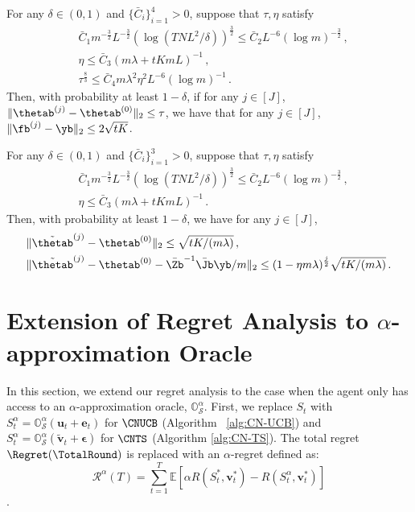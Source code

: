 \documentclass{article}
\theoremstyle{plain}
\begin{document}
\begin{lemma} \label{aux lemma:lemma C.3 in NeuralUCB}
For any $\delta \in (0,1)$ and $ \{ \bar{C}_i \}_{i=1}^4 > 0$, suppose that $\tau, \eta$ satisfy
%
    \begin{align*}
        & \bar{C}_1 m^{-\frac{3}{2}} L^{-\frac{3}{2}} \left( \log(T N L^2/\delta) \right)^{\frac{3}{2}} 
            \le 
            \bar{C}_2 L^{-6} (\log m)^{-\frac{3}{2}} \, ,
        \\
        & \eta \le \bar{C}_3 (m \lambda + tKmL)^{-1} \, ,
        \\
        & \tau^{\frac{8}{3}} \le \bar{C}_4 m \lambda^2 \eta^2 L^{-6} (\log m )^{-1} \, .
    \end{align*}
%
Then, with probability at least $1 - \delta$, if for any $j \in [J]$, $\| \thetab^{(j)} - \thetab^{(0)} \|_2 \le \tau$, we have that for any $j \in [J]$, $\| \fb^{(j)} - \yb \|_2 \le 2 \sqrt{tK}$.
\end{lemma}

\begin{lemma} \label{aux lemma:lemma C.4 in NeuralUCB}
For any $\delta \in (0,1)$ and $ \{ \bar{C}_i \}_{i=1}^3 > 0$, suppose that $\tau, \eta$ satisfy
%
    \begin{align*}
        & \bar{C}_1 m^{-\frac{3}{2}} L^{-\frac{3}{2}} \left( \log(T N L^2/\delta) \right)^{\frac{3}{2}} 
            \le 
            \bar{C}_2 L^{-6} (\log m)^{-\frac{3}{2}} \, ,
        \\
        & \eta \le \bar{C}_3 (m \lambda + tKmL)^{-1} \, .
    \end{align*}
%
Then, with probability at least $1 - \delta$, we have for any $j \in [J]$,
%
    \begin{align*}
        & \| \tilde{\thetab}^{(j)} - \thetab^{(0)} \|_2 \le \sqrt{tK/(m \lambda)} \, ,
        \\
        & \| \tilde{\thetab}^{(j)} - \thetab^{(0)} - \bar{\Zb}^{-1} \bar{\Jb} \yb / m \|_2 \le (1 - \eta m \lambda)^{\frac{j}{2}} \sqrt{tK/(m \lambda)} \, .
    \end{align*}
\end{lemma}

\section{Extension of Regret Analysis to $\alpha$-approximation Oracle} \label{appendix_Alpha Oracle}
In this section, we extend our regret analysis to the case when the agent only has access to an $\alpha$-approximation oracle, $\mathbb{O}_{\mathcal{S}}^{\alpha}$.
First, we replace $S_t$ with $S_t^{\alpha} = \mathbb{O}_{\mathcal{S}}^{\alpha} (\mathbf{u}_t + \mathbf{e}_t)$ for $\CNUCB$ (Algorithm~ \ref{alg:CN-UCB}) and $S_t^{\alpha} = \mathbb{O}_{\mathcal{S}}^{\alpha} (\mathbf{\tilde{v}}_t + \boldsymbol{\epsilon})$ for $\CNTS$ (Algorithm \ref{alg:CN-TS}).
The total regret $\Regret(\TotalRound)$ is replaced with an $\alpha$-regret defined as:
$$\mathcal{R}^{\alpha}(T) = \sum_{t=1}^{T} \mathbb{E} \left[ \alpha R(S_t^*, \mathbf{v}_t^*) - R(S_t^\alpha, \mathbf{v}_t^*) \right]$$.
\end{document}
